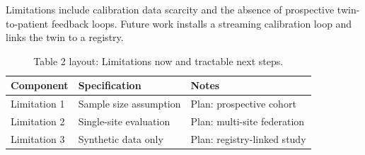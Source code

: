 
Limitations include calibration data scarcity and the absence of prospective twin-to-patient feedback loops. Future work installs a streaming calibration loop and links the twin to a registry.

\begin{table}[H]
\caption{Table 2 layout: Limitations now and tractable next steps.}
\label{tab:limits_future}
\centering
\begin{tabular}{>{\raggedright\arraybackslash}p{3.4cm} >{\raggedright\arraybackslash}p{4.6cm} >{\raggedright\arraybackslash}p{5.4cm}}
\toprule
\textbf{Component} & \textbf{Specification} & \textbf{Notes} \\
\midrule
  Limitation 1 & Sample size assumption & Plan: prospective cohort \\
  Limitation 2 & Single-site evaluation & Plan: multi-site federation \\
  Limitation 3 & Synthetic data only & Plan: registry-linked study \\
\bottomrule
\end{tabular}
\end{table}
